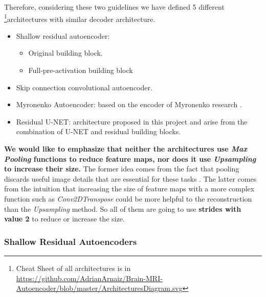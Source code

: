 Therefore, considering these two guidelines we have defined 5 different \footnote{Cheat Sheet of all architectures is in \url{https://github.com/AdrianArnaiz/Brain-MRI-Autoencoder/blob/master/ArchitecturesDiagram.svg}}{architectures} with similar decoder architecture.

\begin{itemize}
    \item Shallow residual autoencoder:
    \begin{itemize}
        \item Original building block.
        \item Full-pre-activation building block
    \end{itemize}
    \item Skip connection convolutional autoencoder.
    \item Myronenko Autoencoder: based on the encoder of Myronenko research \cite{myronenko20183d}.
    \item Residual U-NET: architecture proposed in this project and arise from the combination of U-NET and residual building blocks.
\end{itemize}

\textbf{We would like to emphasize that neither the architectures use \textit{Max Pooling} functions to reduce feature maps, nor does it use \textit{Upsampling} to increase their size.} The former idea comes from the fact that pooling discards useful image details that are essential for these tasks \cite{superresolution}. The latter comes from the intuition that increasing the size of feature maps with a more complex function such as \textit{Conv2DTranspose} could be more helpful to the reconstruction than the \textit{Upsampling} method. So all of them are going to use \textbf{strides with value 2} to reduce or increase the size.

\subsubsection{Shallow Residual Autoencoders}
\label{section:residualarchs}


